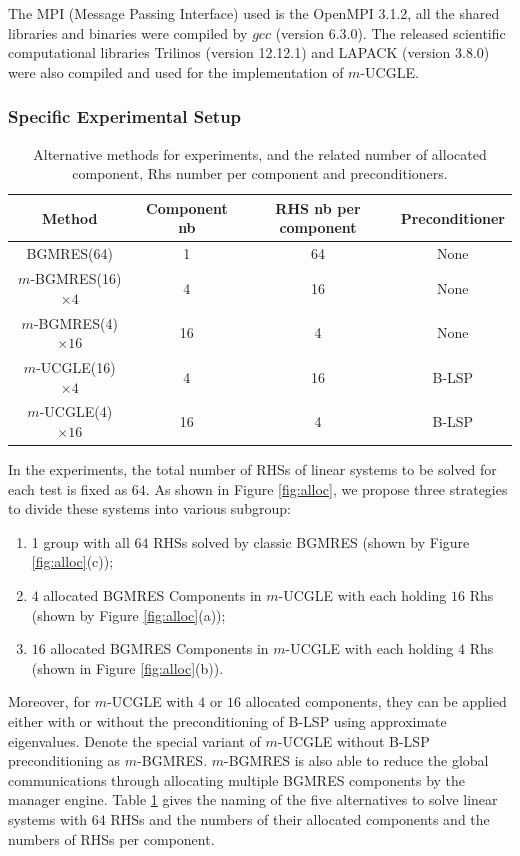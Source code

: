 The MPI (Message Passing Interface) used is the OpenMPI 3.1.2, all the shared libraries and binaries were compiled by $gcc$ (version 6.3.0). The released scientific computational libraries Trilinos (version 12.12.1) and LAPACK (version 3.8.0) were also compiled and used for the implementation of $m$-UCGLE. 

\subsubsection{Specific Experimental Setup}

\begin{table}[htbp]
	\renewcommand{\arraystretch}{1.4}
	\small	
	\caption{Alternative methods for experiments, and the related number of allocated component, Rhs number per component and preconditioners.}
	\label{allocname}
	\centering
	\begin{tabular}{c|c|c|c}
		\toprule
		Method & Component nb & RHS nb per component & Preconditioner  \\
		\midrule
		BGMRES(64)  &1& 64 & None\\
		$m$-BGMRES(16)$\times 4$ &4 & 16 & None  \\
		$m$-BGMRES(4)$\times 16$ & 16 & 4 & None   \\
		$m$-UCGLE(16)$\times 4$ & 4 & 16 & B-LSP   \\
		$m$-UCGLE(4)$\times 16$ & 16 & 4 & B-LSP  \\
		\bottomrule
	\end{tabular}
	\label{name}
\end{table}

In the experiments, the total number of RHSs of linear systems to be solved for each test is fixed as $64$. As shown in Figure \ref{fig:alloc}, we propose three strategies to divide these systems into various subgroup: 

\begin{enumerate}
	\item 1 group with all $64$ RHSs solved by classic BGMRES (shown by Figure \ref{fig:alloc}(c));
	\item  $4$ allocated BGMRES Components in $m$-UCGLE with each holding $16$ Rhs (shown by Figure \ref{fig:alloc}(a));
	\item $16$ allocated BGMRES Components in $m$-UCGLE with each holding $4$ Rhs (shown in Figure \ref{fig:alloc}(b)).
\end{enumerate}

Moreover, for $m$-UCGLE with $4$ or $16$ allocated components, they can be applied either with or without the preconditioning of B-LSP using approximate eigenvalues. Denote the special variant of $m$-UCGLE without B-LSP preconditioning as $m$-BGMRES. $m$-BGMRES is also able to reduce the global communications through allocating multiple BGMRES components by the manager engine. Table \ref{name} gives the naming of the five alternatives to solve linear systems with $64$ RHSs and the numbers of their allocated components and the numbers of RHSs per component.


